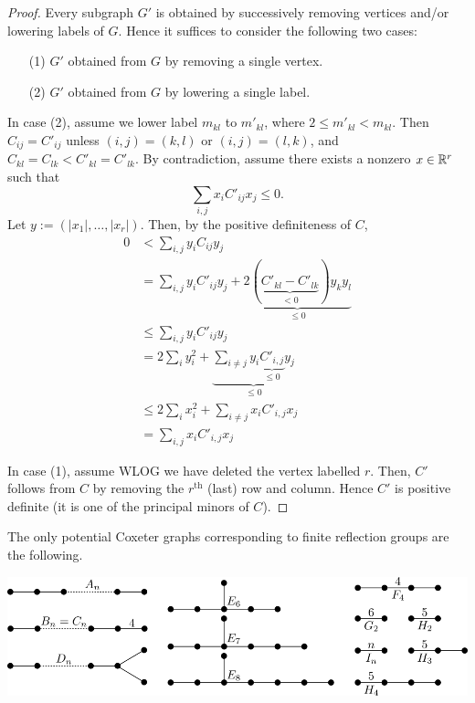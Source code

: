 \begin{proof}
Every subgraph $G'$ is obtained by successively removing vertices and/or
lowering labels of $G$. Hence it suffices to consider the following two cases:
\begin{enumerate}
\item[(1)] $G'$ obtained from $G$ by removing a single vertex.
\item[(2)] $G'$ obtained from $G$ by lowering a single label.
\end{enumerate}

In case (2), assume we lower label $m_{kl}$ to $m'_{kl}$, where
$2 \leq m'_{kl} < m_{kl}$. Then $C_{ij} = C'_{ij}$ unless $(i,j)=(k,l)$ or
$(i,j)=(l,k)$, and $C_{kl} = C_{lk} < C'_{kl} = C'_{lk}$. By contradiction,
assume there exists a nonzero $x \in \mathbb{R}^r$ such that
\[
    \sum_{i,j} x_i C'_{ij} x_j \leq 0.
\]
Let $y := (|x_1|, \dots, |x_r|)$. Then, by the positive definiteness of $C$,
\begin{align*}
    0 &< \sum_{i,j} y_i C_{ij} y_j \\
    &= \sum_{i,j} y_i C'_{ij} y_j +
    \underbrace{2( \underbrace{C'_{kl} - C'_{lk}}_{<0}) y_k y_l}_{\leq 0} \\
    &\leq \sum_{i,j} y_i C'_{ij} y_j \\
    &= 2 \sum_{i} y_i^2 +
    \underbrace{\sum_{i \neq j} y_i \underbrace{C'_{i,j}}_{\leq 0} y_j}_{\leq 0} \\
    &\leq 2 \sum_{i} x_i^2 +
    \sum_{i \neq j} x_i C'_{i,j} x_j \\
    &= \sum_{i,j} x_i C'_{i,j} x_j
\end{align*}

In case (1), assume WLOG we have deleted the vertex labelled $r$. Then,
$C'$ follows from $C$ by removing the $r^{\text{th}}$ (last) row and column.
Hence $C'$ is positive definite (it is one of the principal minors of $C$).
\end{proof}

\begin{proposition} \label{prop17}
The only potential Coxeter graphs corresponding to finite reflection groups are
the following.
\end{proposition}

\begin{center}
\includegraphics[width=\textwidth]{img/finite-groups.png}
\end{center}


